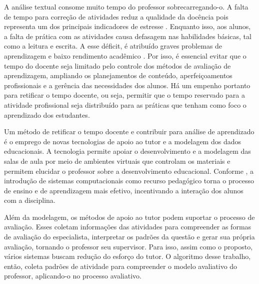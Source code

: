 A análise textual consome muito tempo do professor sobrecarregando-o. A falta de tempo para correção de atividades reduz a qualidade da docência pois representa um dos principais indicadores de estresse \cite{assuncao2009}. Enquanto isso, aos alunos, a falta de prática com as atividades causa defasagem nas habilidades básicas, tal como a leitura e escrita. A esse déficit, é atribuído  graves problemas de aprendizagem e baixo rendimento acadêmico \cite{martens2016}. Por isso, é essencial evitar que o tempo do docente seja limitado pelo controle dos métodos de avaliação de aprendizagem, ampliando os planejamentos de conteúdo, aperfeiçoamentos profissionais e a gerência das necessidades dos alunos. Há um empenho portanto para retificar o tempo docente, ou seja, permitir que o tempo reservado para a atividade profissional seja distribuído para as práticas que tenham como foco o aprendizado dos estudantes.

Um método de retificar o tempo docente e contribuir para análise de aprendizado é o emprego de novas tecnologias de apoio ao tutor e a modelagem dos dados educacionais. A tecnologia permite apoiar o desenvolvimento e a modelagem das salas de aula por meio de ambientes virtuais que controlam os materiais e permitem elucidar o professor sobre a desenvolvimento educacional. Conforme , a introdução de sistemas computacionais como recurso pedagógico torna o processo de ensino e de aprendizagem mais efetivo, incentivando a interação dos alunos com a disciplina.

Além da modelagem, os métodos de apoio ao tutor podem suportar o processo de avaliação. Esses coletam informações das atividades para compreender as formas de avaliação do especialista, interpretar os padrões da questão e gerar sua própria avaliação, tornando o professor seu supervisor. Para isso, assim como o proposto, vários sistemas buscam redução do esforço do tutor. O algoritmo desse trabalho, então, coleta padrões de atividade para compreender o modelo avaliativo do professor, aplicando-o no processo avaliativo.

\begin{comment}
Este tipo de sistema já é formalmente conhecido com bons desempenhos na verificação de aprendizado de programação \cite{marcia1}\cite{marcia2}. Porém, no caso da verificação das questões discursivas, os diferentes interpretações e formas de escrita, frequentemente sutis, entre as avaliações do docente ampliam a complexidade para suporte à avaliação.


Deste modo, o foco deste trabalho é apoiar a verificação de questões discursivas com seu amplo uso didático e acréscimo educacional. 
\end{comment}


